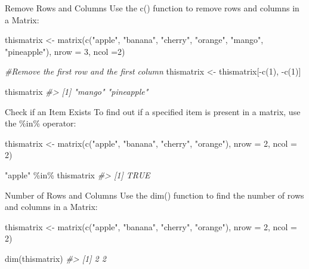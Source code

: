 \documentclass[
]{book}
\newenvironment{Shaded}{\begin{snugshade}}{\end{snugshade}}
\newcommand{\AttributeTok}[1]{\textcolor[rgb]{0.77,0.63,0.00}{#1}}
\newcommand{\CommentTok}[1]{\textcolor[rgb]{0.56,0.35,0.01}{\textit{#1}}}
\newcommand{\DecValTok}[1]{\textcolor[rgb]{0.00,0.00,0.81}{#1}}
\newcommand{\FunctionTok}[1]{\textcolor[rgb]{0.00,0.00,0.00}{#1}}
\newcommand{\NormalTok}[1]{#1}
\newcommand{\OtherTok}[1]{\textcolor[rgb]{0.56,0.35,0.01}{#1}}
\newcommand{\SpecialCharTok}[1]{\textcolor[rgb]{0.00,0.00,0.00}{#1}}
\newcommand{\StringTok}[1]{\textcolor[rgb]{0.31,0.60,0.02}{#1}}
\begin{document}
Remove Rows and Columns
Use the c() function to remove rows and columns in a Matrix:

\begin{Shaded}
\begin{Highlighting}[]
\NormalTok{thismatrix }\OtherTok{\textless{}{-}} \FunctionTok{matrix}\NormalTok{(}\FunctionTok{c}\NormalTok{(}\StringTok{"apple"}\NormalTok{, }\StringTok{"banana"}\NormalTok{, }\StringTok{"cherry"}\NormalTok{, }\StringTok{"orange"}\NormalTok{, }\StringTok{"mango"}\NormalTok{, }\StringTok{"pineapple"}\NormalTok{), }\AttributeTok{nrow =} \DecValTok{3}\NormalTok{, }\AttributeTok{ncol =}\DecValTok{2}\NormalTok{)}

\CommentTok{\#Remove the first row and the first column}
\NormalTok{thismatrix }\OtherTok{\textless{}{-}}\NormalTok{ thismatrix[}\SpecialCharTok{{-}}\FunctionTok{c}\NormalTok{(}\DecValTok{1}\NormalTok{), }\SpecialCharTok{{-}}\FunctionTok{c}\NormalTok{(}\DecValTok{1}\NormalTok{)]}

\NormalTok{thismatrix}
\CommentTok{\#\textgreater{} [1] "mango"     "pineapple"}
\end{Highlighting}
\end{Shaded}

Check if an Item Exists
To find out if a specified item is present in a matrix, use the \%in\% operator:

\begin{Shaded}
\begin{Highlighting}[]
\NormalTok{thismatrix }\OtherTok{\textless{}{-}} \FunctionTok{matrix}\NormalTok{(}\FunctionTok{c}\NormalTok{(}\StringTok{"apple"}\NormalTok{, }\StringTok{"banana"}\NormalTok{, }\StringTok{"cherry"}\NormalTok{, }\StringTok{"orange"}\NormalTok{), }\AttributeTok{nrow =} \DecValTok{2}\NormalTok{, }\AttributeTok{ncol =} \DecValTok{2}\NormalTok{)}

\StringTok{"apple"} \SpecialCharTok{\%in\%}\NormalTok{ thismatrix}
\CommentTok{\#\textgreater{} [1] TRUE}
\end{Highlighting}
\end{Shaded}

Number of Rows and Columns
Use the dim() function to find the number of rows and columns in a Matrix:

\begin{Shaded}
\begin{Highlighting}[]
\NormalTok{thismatrix }\OtherTok{\textless{}{-}} \FunctionTok{matrix}\NormalTok{(}\FunctionTok{c}\NormalTok{(}\StringTok{"apple"}\NormalTok{, }\StringTok{"banana"}\NormalTok{, }\StringTok{"cherry"}\NormalTok{, }\StringTok{"orange"}\NormalTok{), }\AttributeTok{nrow =} \DecValTok{2}\NormalTok{, }\AttributeTok{ncol =} \DecValTok{2}\NormalTok{)}

\FunctionTok{dim}\NormalTok{(thismatrix)}
\CommentTok{\#\textgreater{} [1] 2 2}
\end{Highlighting}
\end{Shaded}
\end{document}
